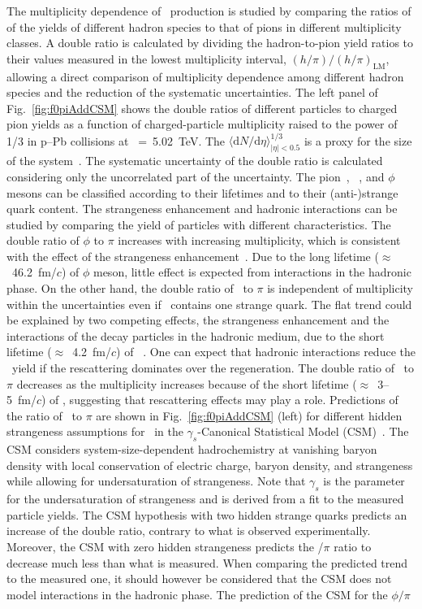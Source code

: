 The multiplicity dependence of \fzero~production is studied by comparing the ratios of of the yields of different hadron species to that of pions in different multiplicity classes. A double ratio is calculated by dividing the hadron-to-pion yield ratios to their values measured in the lowest multiplicity interval, $(h/\pi)/(h/\pi)_{\mathrm{LM}}$, allowing a direct comparison of multiplicity dependence among different hadron species and the reduction of the systematic uncertainties. The left panel of Fig.~\ref{fig:f0piAddCSM} shows the double ratios of different particles to charged pion yields as a function of charged-particle multiplicity raised to the power of 1/3 in p--Pb collisions at \snn~=~5.02~TeV. The $\langle \mathrm{d}N/\mathrm{d}\eta \rangle_{|\eta|<0.5}^{1/3}$ is a proxy for the size of the system~\cite{Liu:2018xae}. The systematic uncertainty of the double ratio is calculated considering only the uncorrelated part of the uncertainty. The pion~\cite{ALICE:2016dei}, \kstar~\cite{ALICE:2016sak}, and $\phi$~\cite{ALICE:2016sak} mesons can be classified according to their lifetimes and to their (anti-)strange quark content. The strangeness enhancement and hadronic interactions can be studied by comparing the yield of particles with different characteristics. The double ratio of $\phi$ to $\pi$ increases with increasing multiplicity, which is consistent with the effect of the strangeness enhancement~\cite{ALICE:2016fzo}. Due to the long lifetime ($\approx$~46.2~fm/$c$) of $\phi$ meson, little effect is expected from interactions in the hadronic phase. On the other hand, the double ratio of \kstar~to $\pi$ is independent of multiplicity within the uncertainties even if \kstar~contains one strange quark. The flat trend could be explained by two competing effects, the strangeness enhancement and the interactions of the decay particles in the hadronic medium, due to the short lifetime ($\approx$~4.2~fm/$c$) of \kstar~\cite{ParticleDataGroup:2022pth}. One can expect that hadronic interactions reduce the \kstar~yield if the rescattering dominates over the regeneration. The double ratio of \fzero~to $\pi$ decreases as the multiplicity increases because of the short lifetime ($\approx$~3--5~fm/$c$) of \fzero, suggesting that rescattering effects may play a role. Predictions of the ratio of \fzero~to $\pi$ are shown in Fig.~\ref{fig:f0piAddCSM} (left) for different hidden strangeness assumptions for \fzero~in the $\gamma_{s}$-Canonical Statistical Model (CSM)~\cite{Vovchenko:2019kes}. The CSM considers system-size-dependent hadrochemistry at vanishing baryon density with local conservation of electric charge, baryon density, and strangeness while allowing for undersaturation of strangeness. Note that $\gamma_{s}$ is the parameter for the undersaturation of strangeness and is derived from a fit to the measured particle yields. The CSM hypothesis with two hidden strange quarks predicts an increase of the double ratio, contrary to what is observed experimentally. Moreover, the CSM with zero hidden strangeness predicts the \fzero/$\pi$ ratio to decrease much less than what is measured. When comparing the predicted trend to the measured one, it should however be considered that the CSM does not model interactions in the hadronic phase. The prediction of the CSM for the $\phi/\pi$ 